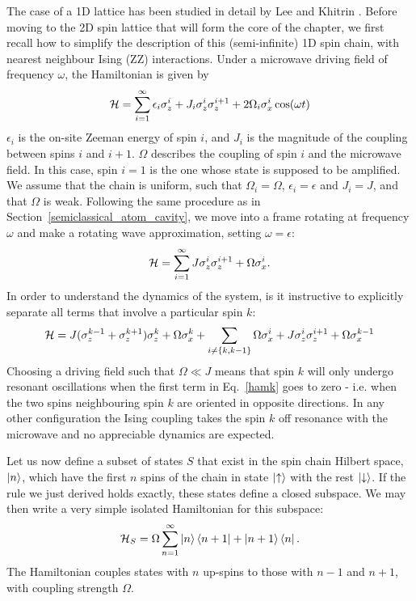 The case of a 1D lattice has been studied in detail by Lee and Khitrin \cite{Lee:2005p6468}. Before moving to the 2D spin lattice that will form the core of the chapter, we first recall how to simplify the description of this (semi-infinite) 1D spin chain, with nearest neighbour Ising (ZZ) interactions. Under a microwave driving field of frequency $\omega$, the Hamiltonian is given by
\begin{equation} {\cal H} = \sum_{i=1}^{\infty} \epsilon_i \sigma^i_z
  + J_i \sigma_z^i\sigma_z^{i+1} + 2 \Omega_i \sigma_x^i \cos(\omega
  t)
\end{equation}
$\epsilon_i$ is the on-site Zeeman energy of spin $i$, and $J_i$ is the magnitude of the coupling between spins $i$ and $i+1$. $\Omega$ describes the coupling of spin $i$ and the microwave field. In this case, spin $i=1$ is the one whose state is supposed to be amplified. We assume that the chain is uniform, such that $\Omega_i = \Omega$, $\epsilon_i = \epsilon$ and $J_i = J$, and that $\Omega$ is weak. Following the same procedure as in Section~\ref{semiclassical_atom_cavity}, we move into a frame rotating at frequency $\omega$ and make a rotating wave approximation, setting $\omega = \epsilon$:
\begin{equation} {\cal H} = \sum_{i=1}^{\infty} J
  \sigma_z^i\sigma_z^{i+1} + \Omega \sigma_x^i .
\end{equation}
In order to understand the dynamics of the system, is it instructive to explicitly separate all terms that involve a particular spin $k$:
\begin{equation} {\cal H} = J (\sigma_z^{k-1} +
  \sigma_z^{k+1})\sigma_z^k + \Omega \sigma^k_x + \sum_{i \neq \{k,
  k-1\}} \Omega\sigma_x^i + J \sigma_z^i\sigma_z^{i+1} +
  \Omega\sigma_x^{k-1}
  \label{hamk}
\end{equation}
Choosing a driving field such that $\Omega\ll J$ means that spin $k$ will only undergo resonant oscillations when the first term in Eq.~\ref{hamk} goes to zero - i.e. when the two spins neighbouring spin $k$ are oriented in opposite directions. In any other configuration the Ising coupling takes the spin $k$ off resonance with the microwave and no appreciable dynamics are expected.

Let us now define a subset of states $S$ that exist in the spin chain Hilbert space, $\left\vert n\right\rangle$, which have the first $n$ spins of the chain in state $\left\vert\uparrow\right\rangle$ with the rest $\left\vert\downarrow\right\rangle$. If the rule we just derived holds exactly, these states define a closed subspace. We may then write a very simple isolated Hamiltonian for this subspace:
\begin{equation}
  {\cal H}_S = \Omega \sum_{n=1}^\infty \left\vert n\right\rangle\left\langle  n+1\right\vert+\left\vert n+1\right\rangle\left\langle  n\right\vert.
  \label{1d_ham}
\end{equation}
The Hamiltonian couples states with $n$ up-spins to those with $n-1$ and $n+1$, with coupling strength $\Omega$. 

